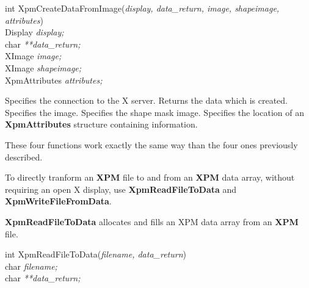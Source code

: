 \begin{flushleft}

int XpmCreateDataFromImage({\it display, data\_return, image, shapeimage,\\
\hspace{3cm}attributes})\\

\hspace{1cm}Display {\it *display;}\\
\hspace{1cm}char {\it ***data\_return;}\\
\hspace{1cm}XImage {\it *image;}\\
\hspace{1cm}XImage {\it *shapeimage;}\\
\hspace{1cm}XpmAttributes {\it *attributes;}

\end{flushleft}

\begin{description}

 Specifies the connection to the X server.
 Returns the data which is created.
 Specifies the image.
 Specifies the shape mask image.
 Specifies the location of an {\bf XpmAttributes} structure
containing information.

\end{description} 

These four functions work exactly the same way than the four ones previously
described.

\vspace{.5cm}
To directly tranform an {\bf XPM} file to and from an {\bf XPM} data
array, without requiring an open X display, use {\bf
XpmReadFileToData} and {\bf XpmWriteFileFromData}.

\vspace{.2cm}
{\bf XpmReadFileToData} allocates and fills an XPM data array from an {\bf XPM} file.

\begin{flushleft} 

int XpmReadFileToData({\it filename, data\_return})\\

\hspace{1cm}char {\it *filename;}\\
\hspace{1cm}char {\it ***data\_return;}

\end{flushleft}

